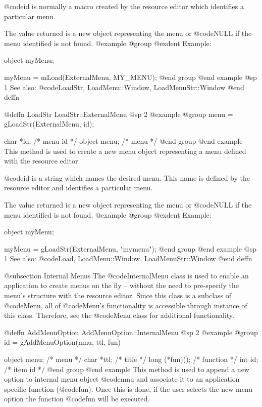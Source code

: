 @code{id} is normally a macro created by the resource editor which identifies
a particular menu.

The value returned is a new object representing the menu or @code{NULL} if
the menu identified is not found.
@example
@group
@exdent Example:

object  myMenu;

myMenu = mLoad(ExternalMenu, MY_MENU);
@end group
@end example
@sp 1
See also:  @code{LoadStr, LoadMenu::Window, LoadMenuStr::Window}
@end deffn







@deffn {LoadStr} LoadStr::ExternalMenu
@sp 2
@example
@group
menu = gLoadStr(ExternalMenu, id);

char    *id;    /*  menu id  */
object  menu;   /*  menu     */
@end group
@end example
This method is used to create a new menu object representing a menu defined
with the resource editor.

@code{id} is a string which names the desired menu.  This name is
defined by the resource editor and identifies a particular menu.

The value returned is a new object representing the menu or @code{NULL} if
the menu identified is not found.
@example
@group
@exdent Example:

object  myMenu;

myMenu = gLoadStr(ExternalMenu, "mymenu");
@end group
@end example
@sp 1
See also:  @code{Load, LoadMenu::Window, LoadMenuStr::Window}
@end deffn








@subsection Internal Menus
The @code{InternalMenu} class is used to enable an application to create
menus on the fly -- without the need to pre-specify the menu's structure
with the resource editor.  Since this class is a subclass of
@code{Menu}, all of @code{Menu}'s functionality is accessible through
instance of this class.  Therefore, see the @code{Menu} class for
additional functionality.








@deffn {AddMenuOption} AddMenuOption::InternalMenu
@sp 2
@example
@group
id = gAddMenuOption(mnu, ttl, fun)

object  menu;   /*  menu     */
char    *ttl;   /*  title    */
long    (*fun)(); /*  function  */
int     id;     /*  item id  */
@end group
@end example
This method is used to append a new option to internal menu object
@code{mnu} and associate it to an application specific function
(@code{fun}).  Once this is done, if the user selects the new menu
option the function @code{fun} will be executed.

